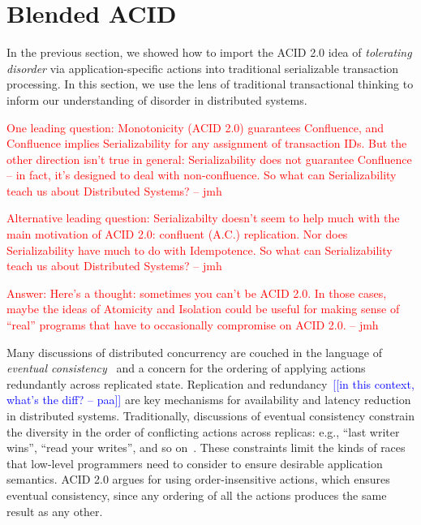 \documentclass{sig-alternate}
\newcommand{\jmh}[1]{{\textcolor{red}{#1 -- jmh}}}
\newcommand{\paa}[1]{{\textcolor{blue}{[[#1 -- paa]]}}}
\begin{document}
\section{Blended ACID}
In the previous section, we showed how to import the ACID 2.0 idea of
\emph{tolerating disorder} via application-specific actions into traditional
serializable transaction processing. In this section, we use the lens of
traditional transactional thinking to inform our understanding of disorder in
distributed systems.

\jmh{One leading question:  Monotonicity (ACID 2.0) guarantees Confluence, and Confluence implies Serializability for any assignment of transaction IDs.  But the other direction isn't true in general: Serializability does not guarantee Confluence -- in fact, it's designed to deal with non-confluence.  So what can Serializability teach us about Distributed Systems?}

\jmh{Alternative leading question: Serializabilty doesn't seem to help much with the main motivation of ACID 2.0: confluent (A.C.) replication. Nor does Serializability have much to do with Idempotence.  So what can Serializability teach us about Distributed Systems?}

\jmh{Answer: Here's a thought: sometimes you can't be ACID 2.0.  In those cases, maybe the ideas of Atomicity and Isolation could be useful for making sense of ``real'' programs that have to occasionally compromise on ACID 2.0.}

Many discussions of distributed concurrency are couched in the language of
\emph{eventual consistency}~\cite{Terry1995} and a concern for the ordering of
applying actions redundantly across replicated state.  Replication and
redundancy~\paa{in this context, what's the diff?} are key mechanisms for availability and latency reduction in
distributed systems.  Traditionally, discussions of eventual consistency
constrain the diversity in the order of conflicting actions across replicas:
e.g., ``last writer wins'', ``read your writes'', and so on~\cite{Terry1994}.
These constraints limit the kinds of races that low-level programmers need to
consider to ensure desirable application semantics.  ACID 2.0 argues for using
order-insensitive actions, which ensures eventual consistency, since any
ordering of all the actions produces the same result as any other.
\end{document}
